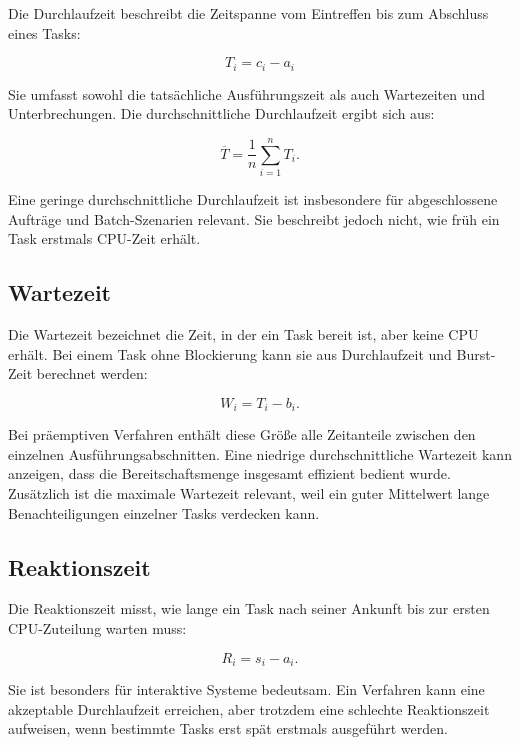 Die Durchlaufzeit beschreibt die Zeitspanne vom Eintreffen bis zum Abschluss eines Tasks:

\begin{equation}
T_i = c_i - a_i
\label{eq:durchlaufzeit}
\end{equation}

Sie umfasst sowohl die tatsächliche Ausführungszeit als auch Wartezeiten und Unterbrechungen. Die durchschnittliche Durchlaufzeit ergibt sich aus:

\begin{equation}
\overline{T} = \frac{1}{n} \sum_{i=1}^{n} T_i.
\label{eq:durchschnittliche-durchlaufzeit}
\end{equation}

Eine geringe durchschnittliche Durchlaufzeit ist insbesondere für abgeschlossene Aufträge und Batch-Szenarien relevant. Sie beschreibt jedoch nicht, wie früh ein Task erstmals CPU-Zeit erhält.

\subsection{Wartezeit}

Die Wartezeit bezeichnet die Zeit, in der ein Task bereit ist, aber keine CPU erhält. Bei einem Task ohne Blockierung kann sie aus Durchlaufzeit und Burst-Zeit berechnet werden:

\begin{equation}
W_i = T_i - b_i.
\label{eq:wartezeit}
\end{equation}

Bei präemptiven Verfahren enthält diese Größe alle Zeitanteile zwischen den einzelnen Ausführungsabschnitten. Eine niedrige durchschnittliche Wartezeit kann anzeigen, dass die Bereitschaftsmenge insgesamt effizient bedient wurde. Zusätzlich ist die maximale Wartezeit relevant, weil ein guter Mittelwert lange Benachteiligungen einzelner Tasks verdecken kann.

\subsection{Reaktionszeit}

Die Reaktionszeit misst, wie lange ein Task nach seiner Ankunft bis zur ersten CPU-Zuteilung warten muss:

\begin{equation}
R_i = s_i - a_i.
\label{eq:reaktionszeit}
\end{equation}

Sie ist besonders für interaktive Systeme bedeutsam. Ein Verfahren kann eine akzeptable Durchlaufzeit erreichen, aber trotzdem eine schlechte Reaktionszeit aufweisen, wenn bestimmte Tasks erst spät erstmals ausgeführt werden.

